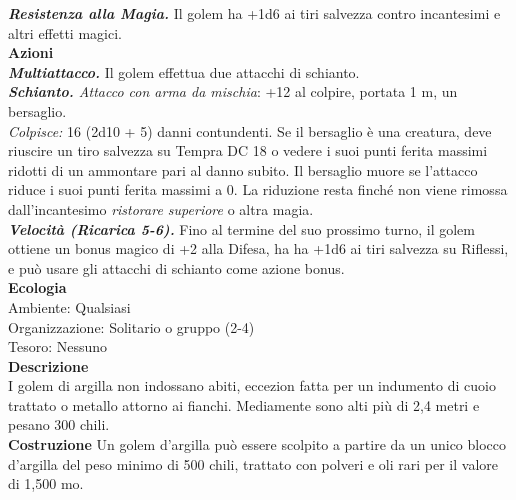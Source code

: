 \begin{multicols}{2}
\emph{\textbf{Resistenza alla Magia.}} Il golem ha +1d6 ai tiri salvezza contro incantesimi e altri effetti magici.\\
\smallskip\textbf{Azioni} \\
\emph{\textbf{Multiattacco.}} Il golem effettua due attacchi di schianto.\\
\emph{\textbf{Schianto.} Attacco con arma da mischia}: +12 al colpire, portata 1 m, un bersaglio.\\
\emph{Colpisce:} 16 (2d10 + 5) danni contundenti. Se il bersaglio è una creatura, deve riuscire un tiro salvezza su Tempra DC  18 o vedere i suoi punti ferita massimi ridotti di un ammontare pari al danno subito. Il bersaglio muore se l'attacco riduce i suoi punti ferita massimi a 0. La riduzione resta finché non viene rimossa dall'incantesimo \emph{ristorare superiore} o altra magia.\\
\emph{\textbf{Velocità (Ricarica 5-6).}} Fino al termine del suo prossimo turno, il golem ottiene un bonus magico di +2 alla Difesa, ha ha +1d6 ai tiri salvezza su Riflessi, e può usare gli attacchi di schianto come azione bonus.\\
\textbf{Ecologia}\\
Ambiente: Qualsiasi\\
Organizzazione: Solitario o gruppo (2-4)\\
Tesoro: Nessuno\\
\textbf{Descrizione}\\
I golem di argilla non indossano abiti, eccezion fatta per un indumento di cuoio trattato o metallo attorno ai fianchi. Mediamente sono alti più di 2,4 metri e pesano 300 chili.\\
\textbf{Costruzione}
Un golem d'argilla può essere scolpito a partire da un unico blocco d'argilla del peso minimo di 500 chili, trattato con polveri e oli rari per il valore di 1,500 mo.\\


\end{multicols}
